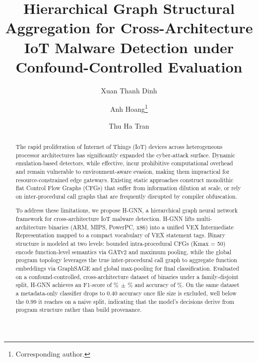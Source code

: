 \documentclass{llncs}
\begin{document}
\title{Hierarchical Graph Structural Aggregation for Cross-Architecture IoT Malware Detection under Confound-Controlled Evaluation}

\author{Xuan Thanh Dinh \and
Anh Hoang\thanks{Corresponding author.} \and
Thu Ha Tran}



\maketitle

\begin{abstract}
The rapid proliferation of Internet of Things (IoT) devices across
heterogeneous processor architectures has significantly expanded
the cyber-attack surface. Dynamic emulation-based detectors, while
effective, incur prohibitive computational overhead and remain
vulnerable to environment-aware evasion, making them impractical
for resource-constrained edge gateways. Existing static approaches
construct monolithic flat Control Flow Graphs (CFGs) that suffer
from information dilution at scale, or rely on inter-procedural
call graphs that are frequently disrupted by compiler obfuscation.

To address these limitations, we propose H-GNN, a hierarchical
graph neural network framework for cross-architecture IoT malware
detection. H-GNN lifts multi-architecture binaries
(ARM, MIPS, PowerPC, x86) into a unified VEX Intermediate Representation
mapped to a compact vocabulary of VEX statement tags. Binary structure is modeled
at two levels: bounded intra-procedural CFGs (Kmax = 50) encode
function-level semantics via GATv2 and maximum pooling, while the 
global program topology leverages the true inter-procedural call graph 
to aggregate function embeddings via GraphSAGE and global max-pooling 
for final classification.
Evaluated on a confound-controlled, cross-architecture dataset of
\hgnnNumSamples binaries under a family-disjoint split, H-GNN achieves an
F1-score of \hgnnF\%$\,\pm\,$\hgnnFstd\% and accuracy of \hgnnAcc\%.
On the same dataset a metadata-only classifier drops to 0.40 accuracy once
file size is excluded, well below the 0.99 it reaches on a naive split,
indicating that the model's decisions derive from program structure rather
than build provenance.
\end{abstract}
\end{document}
